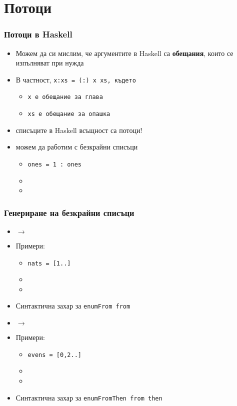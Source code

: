 \documentclass{beamer}
\begin{document}
\section{Потоци}

\begin{frame}
  \frametitle{Потоци в Haskell}
  \begin{itemize}[<+->]
  \item Можем да си мислим, че аргументите в Haskell са \textbf{обещания}, които се изпълняват при нужда
  \item В частност, \tt{x:xs = (:) x xs}, където
    \begin{itemize}
    \item \tt x е обещание за глава
    \item \tt{xs} е обещание за опашка
    \end{itemize}
  \item \alert{списъците в Haskell всъщност са потоци!}
  \item можем да работим с безкрайни списъци
    \begin{itemize}
    \item \tt{ones = 1 : ones}
    \item {}
    \item {}
    \end{itemize}
  \end{itemize}
\end{frame}

\begin{frame}
  \frametitle{Генериране на безкрайни списъци}
  \begin{itemize}
  \item {} $\rightarrow$ 
  \item Примери:
    \begin{itemize}
    \item \tt{nats = [1..]}
    \item {}
    \item {}
    \end{itemize}
  \item Синтактична захар за \tt{enumFrom from}
    \pause
  \item {} $\rightarrow$ 
  \item Примери:
    \begin{itemize}
    \item \tt{evens = [0,2..]}
    \item {}
    \item {}
    \end{itemize}
  \item Синтактична захар за \tt{enumFromThen from then}
  \end{itemize}
\end{frame}
\end{document}
